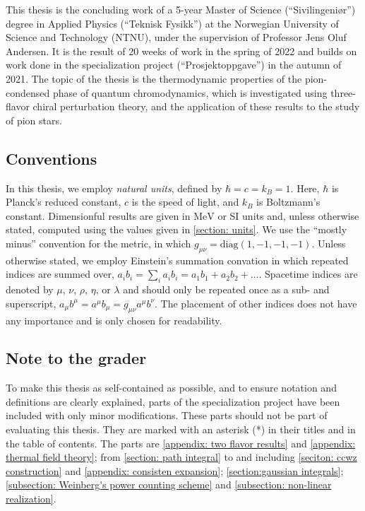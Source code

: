 This thesis is the concluding work of a 5-year Master of Science (``Sivilingeniør'') degree in Applied Physics (``Teknisk Fysikk'') at the Norwegian University of Science and Technology (NTNU), under the supervision of Professor Jens Oluf Andersen.
It is the result of 20 weeks of work in the spring of 2022 and builds on work done in the specialization project (``Prosjektoppgave'') in the autumn of 2021.
The topic of the thesis is the thermodynamic properties of the pion-condensed phase of quantum chromodynamics, which is investigated using three-flavor chiral perturbation theory, and the application of these results to the study of pion stars.

\subsection*{Conventions}

In this thesis, we employ \emph{natural units}, defined by $\hbar = c = k_B = 1$.
Here, $\hbar$ is Planck's reduced constant, $c$ is the speed of light, and $k_B$ is Boltzmann's constant.
Dimensionful results are given in $\text{MeV}$ or SI units and, unless otherwise stated, computed using the values given in \autoref{section: units}.
We use the ``mostly minus'' convention for the metric, in which $g_{\mu \nu} = \text{diag}(1, -1, -1, -1)$.
Unless otherwise stated, we employ Einstein's summation convation in which repeated indices are summed over, $a_i b_i = {\sum}_i a_i b_i = a_1 b_1 +  a_2 b_2 +\dots$.
Spacetime indices are denoted by $\mu$, $\nu$, $\rho$, $\eta$, or $\lambda$ and should only be repeated once as a sub- and superscript, $a_\mu b^\mu = a^\mu b_\mu = g_{\mu\nu}a^\mu b^\nu$.
The placement of other indices does not have any importance and is only chosen for readability.


\subsection*{Note to the grader}

To make this thesis as self-contained as possible, and to ensure notation and definitions are clearly explained, parts of the specialization project have been included with only minor modifications.
These parts should not be part of evaluating this thesis.
They are marked with an asterisk (*) in their titles and in the table of contents.
The parts are \autoref{appendix: two flavor results} and \autoref{appendix: thermal field theory}; from \autoref{section: path integral} to and including \autoref{seciton: ccwz construction} and \autoref{appendix: consisten expansion}; \autoref{section:gaussian integrals}; \autoref{subsection: Weinberg's power counting scheme} and \autoref{subsection: non-linear realization}.

